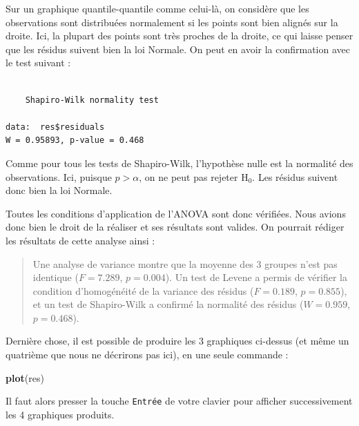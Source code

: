 \documentclass[a4paperpaper,]{article}
\newenvironment{Shaded}{\begin{snugshade}}{\end{snugshade}}
\newcommand{\KeywordTok}[1]{\textcolor[rgb]{0.12,0.11,0.11}{\textbf{#1}}}
\newcommand{\NormalTok}[1]{\textcolor[rgb]{0.12,0.11,0.11}{#1}}
\newcommand{\OperatorTok}[1]{\textcolor[rgb]{0.12,0.11,0.11}{#1}}
\begin{document}
Sur un graphique quantile-quantile comme celui-là, on considère que les observations sont distribuées normalement si les points sont bien alignés sur la droite. Ici, la plupart des points sont très proches de la droite, ce qui laisse penser que les résidus suivent bien la loi Normale. On peut en avoir la confirmation avec le test suivant :

\begin{Shaded}
\end{Shaded}

\begin{verbatim}

    Shapiro-Wilk normality test

data:  res$residuals
W = 0.95893, p-value = 0.468
\end{verbatim}

Comme pour tous les tests de Shapiro-Wilk, l'hypothèse nulle est la normalité des observations. Ici, puisque \(p > \alpha\), on ne peut pas rejeter H\(_0\). Les résidus suivent donc bien la loi Normale.

Toutes les conditions d'application de l'ANOVA sont donc vérifiées. Nous avions donc bien le droit de la réaliser et ses résultats sont valides. On pourrait rédiger les résultats de cette analyse ainsi :

\begin{quote}
Une analyse de variance montre que la moyenne des 3 groupes n'est pas identique (\(F = 7.289\), \(p = 0.004\)). Un test de Levene a permis de vérifier la condition d'homogénéité de la variance des résidus (\(F = 0.189\), \(p = 0.855\)), et un test de Shapiro-Wilk a confirmé la normalité des résidus (\(W = 0.959\), \(p = 0.468\)).
\end{quote}

Dernière chose, il est possible de produire les 3 graphiques ci-dessus (et même un quatrième que nous ne décrirons pas ici), en une seule commande :

\begin{Shaded}
\begin{Highlighting}[]
\KeywordTok{plot}\NormalTok{(res)}
\end{Highlighting}
\end{Shaded}

Il faut alors presser la touche \texttt{Entrée} de votre clavier pour afficher successivement les 4 graphiques produits.
\end{document}
